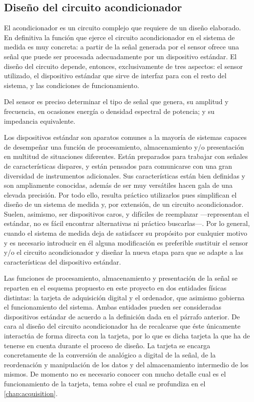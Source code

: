 \subsection{Diseño del circuito acondicionador}

El acondicionador es un circuito complejo que requiere de un diseño
elaborado. En definitiva la función que ejerce el circuito acondicionador
en el sistema de medida es muy concreta: a partir de la señal generada por
el sensor ofrece una señal que puede ser procesada adecuadamente por un
dispositivo estándar. El diseño del circuito depende, entonces,
exclusivamente de tres aspectos: el sensor utilizado, el dispositivo
estándar que sirve de interfaz para con el resto del sistema, y las
condiciones de funcionamiento.

Del sensor es preciso determinar el tipo de señal que genera, su amplitud y
frecuencia, en ocasiones energía o densidad espectral de potencia; y su
impedancia equivalente.

Los dispositivos estándar son aparatos comunes a la mayoría de sistemas
capaces de desempeñar una función de procesamiento, almacenamiento y/o
presentación en multitud de situaciones diferentes. Están preparados para
trabajar con señales de características dispares, y están pensados para
comunicarse con una gran diversidad de instrumentos adicionales. Sus
características están bien definidas y son ampliamente conocidas, además de
ser muy versátiles hacen gala de una elevada precisión. Por todo ello,
resulta práctico utilizarlos pues simplifican el diseño de un sistema de
medida y, por extensión, de un circuito acondicionador. Suelen, asimismo,
ser dispositivos caros, y difíciles de reemplazar ---representan el
estándar, no es fácil encontrar alternativas ni práctico buscarlas---. Por
lo general, cuando el sistema de medida deja de satisfacer su propósito por
cualquier motivo y es necesario introducir en él alguna modificación es
preferible sustituir el sensor y/o el circuito acondicionador y diseñar la
nueva etapa para que se adapte a las características del dispositivo
estándar.

Las funciones de procesamiento, almacenamiento y presentación de la señal
se reparten en el esquema propuesto en este proyecto en dos entidades
físicas distintas: la tarjeta de adquisición digital y el ordenador, que
asimismo gobierna el funcionamiento del sistema. Ambas entidades pueden ser
consideradas dispositivos estándar de acuerdo a la definición dada en el
párrafo anterior. De cara al diseño del circuito acondicionador ha de
recalcarse que éste únicamente interactúa de forma directa con la tarjeta,
por lo que es dicha tarjeta la que ha de tenerse en cuenta durante el
proceso de diseño. La tarjeta \kpci{} se encarga concretamente de la
conversión de analógico a digital de la señal, de la reordenación y
manipulación de los datos y del almacenamiento intermedio de los mismos. De
momento no es necesario conocer con mucho detalle cual es el funcionamiento
de la tarjeta, tema sobre el cual se profundiza en el
\cref{chap:acquisition}.

